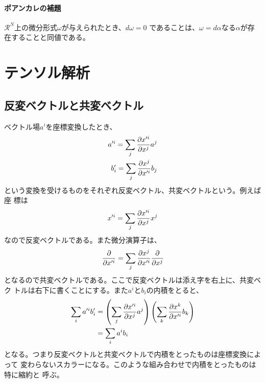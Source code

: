 \documentclass{jsarticle}
\begin{document}
        \paragraph{ポアンカレの補題}
            $\mathcal{R}^N$上の微分形式$\omega$が与えられたとき、$d\omega = 0$
            であることは、$\omega = d\alpha$なる$\alpha$が存在することと同値である。


    \section{テンソル解析}
        \subsection{反変ベクトルと共変ベクトル}
            ベクトル場$a^i$を座標変換したとき、
            \begin{eqnarray*}
                a'^i = \sum_j \pd[x'^i]{x^j}a^j\\
                b'_i = \sum_j \pd[x^j]{x'^i}b_j
            \end{eqnarray*}
            という変換を受けるものをそれぞれ反変ベクトル、共変ベクトルという。例えば座
            標は
                \[x'^i = \sum_j \pd[x'^i]{x^j}x^j\]
            なので反変ベクトルである。また微分演算子は、
                \[\pd{x'^i} = \sum_j \pd[x^j]{x'^i}\pd{x^j}\]
            となるので共変ベクトルである。ここで反変ベクトルは添え字を右上に、共変ベク
            トルは右下に書くことにする。また$a^iとb_i$の内積をとると、
            \begin{align*}
                \sum_i a'^ib'_i &= \lr{\sum_j \pd[x'^i]{x^j}a^j}
                \lr{\sum_k \pd[x^k]{x'^i}b_k}\\
                &= \sum_i a^ib_i
            \end{align*}
            となる。つまり反変ベクトルと共変ベクトルで内積をとったものは座標変換によって
            変わらないスカラーになる。このような組み合わせで内積をとったものは特に縮約と
            呼ぶ。
\end{document}
